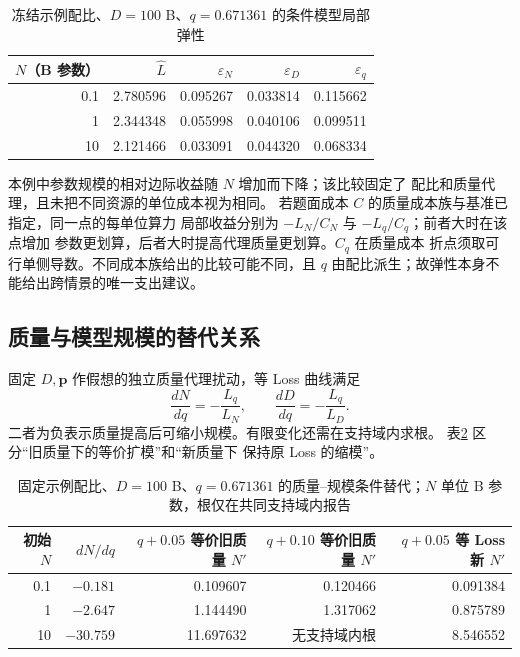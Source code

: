 \begin{table}[htbp]
\centering\small
\caption{冻结示例配比、$D=100$ B、$q=0.671361$ 的条件模型局部弹性}
\label{tab:cyj-q2-elasticity}
\begin{tabular}{rrrrr}
\hline
$N$（B 参数） & $\widehat L$ & $\varepsilon_N$ & $\varepsilon_D$ & $\varepsilon_q$\\ \hline
0.1 & 2.780596 & 0.095267 & 0.033814 & 0.115662\\
1 & 2.344348 & 0.055998 & 0.040106 & 0.099511\\
10 & 2.121466 & 0.033091 & 0.044320 & 0.068334\\ \hline
\end{tabular}
\end{table}

本例中参数规模的相对边际收益随 $N$ 增加而下降；该比较固定了
配比和质量代理，且未把不同资源的单位成本视为相同。
若题面成本 $C$ 的质量成本族与基准已指定，同一点的每单位算力
局部收益分别为 $-L_N/C_N$ 与 $-L_q/C_q$；前者大时在该点增加
参数更划算，后者大时提高代理质量更划算。$C_q$ 在质量成本
折点须取可行单侧导数。不同成本族给出的比较可能不同，且
$q$ 由配比派生；故弹性本身不能给出跨情景的唯一支出建议。

\subsection{质量与模型规模的替代关系}

固定 $D,\boldsymbol p$ 作假想的独立质量代理扰动，等 Loss 曲线满足
\begin{equation}\label{eq:cyj-tradeoff}
\frac{dN}{dq}=-\frac{L_q}{L_N},\qquad
\frac{dD}{dq}=-\frac{L_q}{L_D}.
\end{equation}
二者为负表示质量提高后可缩小规模。有限变化还需在支持域内求根。
表\ref{tab:cyj-q2-tradeoff} 区分“旧质量下的等价扩模”和“新质量下
保持原 Loss 的缩模”。

\begin{table}[htbp]
\centering\small
\caption{固定示例配比、$D=100$ B、$q=0.671361$ 的质量--规模条件替代；$N$ 单位 B 参数，根仅在共同支持域内报告}
\label{tab:cyj-q2-tradeoff}
\begin{tabular}{rrrrr}
\hline
初始 $N$ & $dN/dq$ & $q+0.05$ 等价旧质量 $N'$ & $q+0.10$ 等价旧质量 $N'$ & $q+0.05$ 等 Loss 新 $N'$\\ \hline
0.1 & $-0.181$ & 0.109607 & 0.120466 & 0.091384\\
1 & $-2.647$ & 1.144490 & 1.317062 & 0.875789\\
10 & $-30.759$ & 11.697632 & 无支持域内根 & 8.546552\\ \hline
\end{tabular}
\end{table}

